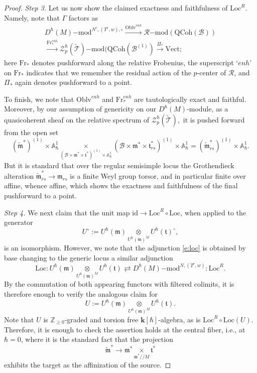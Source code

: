 \documentclass{amsart}
\theoremstyle{definition}
\newcommand{\fm}{\mathfrak{m}}
\newcommand{\lmod}{\on{-mod}}
\newcommand{\ft}{\mathfrak{t}}
\newcommand{\QCoh}{\on{QCoh}}
\newcommand{\sT}{\mathscr{T}}
\newcommand{\on}{\mathrm}
\newcommand{\bk}{\mathbf{k}}
\newcommand{\sB}{\mathscr{B}}
\numberwithin{equation}{section}
\begin{document}
\begin{proof}
{\em \noindent Step 3.} Let us now show the claimed exactness and faithfulness of $\on{Loc}^R$. Namely, note that $\Gamma$ factors as 
\begin{align*}D^\hbar(M)\lmod^{N^r, (T^r, w), \circ} \xrightarrow{\on{Oblv}^{enh}} \mathscr{R}\lmod(\QCoh(\sB)) \\ \xrightarrow{\on{Fr}_*^{enh}} \mathscr{Z}^{\hbar}_p(\widetilde{\sT})\lmod(\QCoh(\sB^{(1)}) \xrightarrow{\Pi_*} \on{Vect};\end{align*}
here $\on{Fr}_*$ denotes pushforward along the relative Frobenius, the superscript `$enh$' on $\on{Fr}_*$ indicates that we remember the residual action of the $p$-center of $\mathscr{R}$, and $\Pi_*$ again denotes pushforward to a point. 

To finish, we note that $\on{Oblv}^{enh}$ and $\on{Fr}_*^{enh}$ are tautologically exact and faithful. Moreover, by our assumption of genericity on our $D^\hbar(M)$-module, as a quasicoherent sheaf on the relative spectrum of $\mathscr{Z}^\hbar_p(\widetilde{\sT}),$ it is pushed forward from the open set 
$$(\widetilde{\fm}^*)^{(1)} \times \mathbb{A}^1_{\hbar} \underset{(\sB \times \fm^* \times \ft^*)^{(1)} \times \mathbb{A}^1_\hbar} \times (\sB \times \fm^* \times \ft_{rs}^*)^{(1)} \times \mathbb{A}^1_\hbar = (\widetilde{\fm}^*_{rs})^{(1)} \times \mathbb{A}^1_\hbar.$$
But it is standard that over the regular semisimple locus the Grothendieck alteration $\widetilde{\fm}^*_{rs} \rightarrow \fm_{rs}$ is a finite Weyl group torsor, and in particular finite over affine, whence affine, which shows the exactness and faithfulness of the final pushforward to a point. 


{\em \noindent Step 4.} We next claim that the unit map $\on{id} \rightarrow \on{Loc}^R \circ \on{Loc}$, when applied to the generator $$U^\circ := U^{\hbar}(\fm) \underset{U^\hbar(\fm)^M} \otimes U^\hbar(\ft)^\circ,$$is an isomorphism. However, we note that the adjunction \eqref{e:loc} is obtained by base changing to the generic locus a similar adjunction 
$$\on{Loc}: U^{\hbar}(\fm) \underset{U^\hbar(\fm)^M} \otimes U^\hbar(\ft) \rightleftarrows D^\hbar(M)\lmod^{N, (T^r,w)}: \on{Loc}^R.$$By the commutation of both appearing functors with 
filtered colimits, it is therefore enough to verify the analogous claim for 
$$U :=  U^{\hbar}(\fm) \underset{U^\hbar(\fm)^M} \otimes U^\hbar(\ft).$$
Note that $U$ is $\mathbb{Z}_{\geqslant 0}$-graded and torsion free $\bk[\hbar]$-algebra, as is $\on{Loc}^R \circ \on{Loc}(U)$. Therefore, it is enough to check the assertion holds at the central fiber, i.e., at $\hbar = 0$, where it is the standard fact that the projection $$\widetilde{\fm}^* \rightarrow \fm^* \underset{\fm^* /\!/ M} \times \ft^*$$exhibits the target as the affinization of the source.  



\end{proof}
\end{document}
